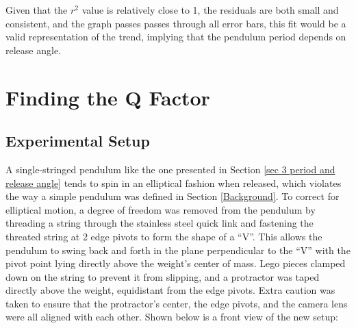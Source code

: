 \documentclass[11pt]{article}
\begin{document}
\begin{multicols}{2}
Given that the $r^2$ value is relatively close to 1, the residuals are both small and consistent, and the graph passes passes through all error bars, this fit would be a valid representation of the trend, implying that the pendulum period depends on release angle.

\section{Finding the Q Factor} \label{sec 4 Finding the Q Factor}

\subsection{Experimental Setup}
A single-stringed pendulum like the one presented in Section \ref{sec 3 period and release angle} tends to spin in an elliptical fashion when released, which violates the way a simple pendulum was defined in Section \ref{Background}. To correct for elliptical motion, a degree of freedom was removed from the pendulum by threading a string through the stainless steel quick link and fastening the threated string at 2 edge pivots to form the shape of a ``V''. This allows the pendulum to swing back and forth in the plane perpendicular to the ``V'' with the pivot point lying directly above the weight's center of mass. Lego pieces clamped down on the string to prevent it from slipping, and a protractor was taped directly above the weight, equidistant from the edge pivots. Extra caution was taken to ensure that the protractor's center, the edge pivots, and the camera lens were all aligned with each other. Shown below is a front view of the new setup:


\end{multicols}
\end{document}
